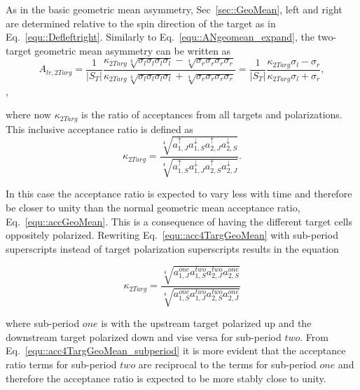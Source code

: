 As in the basic geometric mean asymmetry, Sec~\ref{sec::GeoMean}, left and right
are determined relative to the spin direction of the target as in
Eq.~\ref{equ::Defleftright}.  Similarly to Eq.~\ref{equ::ANgeomean_expand}, the
two-target geometric mean asymmetry can be written as
\begin{equation}
  A_{lr,2Targ}= \frac{1}{|S_T|}
  \frac{
    \kappa_{2Targ} \sqrt[4]{\sigma_l\sigma_l\sigma_l\sigma_l} -
    \sqrt[4]{\sigma_r\sigma_r\sigma_r\sigma_r}
  }{
    \kappa_{2Targ} \sqrt[4]{\sigma_l\sigma_l\sigma_l\sigma_l} +
    \sqrt[4]{\sigma_r\sigma_r\sigma_r\sigma_r}
  }
  =
  \frac{1}{|S_T|}
  \frac{\kappa_{2Targ}\sigma_l - \sigma_r}{
    \kappa_{2Targ}\sigma_l + \sigma_r},
  \label{equ::AN2targAcceptCancel}
\end{equation},

\noindent
where now $\kappa_{2Targ}$ is the ratio of acceptances from all targets and
polarizations.  This inclusive acceptance ratio is defined as
\begin{equation}
  \label{equ::acc4TargGeoMean}
  \kappa_{2Targ} =
  \frac{
    \sqrt[4]{
      a^\uparrow_{1,J}
      a^\downarrow_{1,S}
      a^\uparrow_{2,J}
      a^\downarrow_{2,S}}
  }{
    \sqrt[4]{
      a^\uparrow_{1,S}
      a^\downarrow_{1,J}
      a^\uparrow_{2,S}
      a^\downarrow_{2,J}}
  }.
\end{equation}

\noindent
In this case the acceptance ratio is expected to vary less with time and
therefore be closer to unity than the normal geometric mean acceptance ratio,
Eq.~\ref{equ::accGeoMean}.  This is a consequence of having the different target
cells oppositely polarized.  Rewriting Eq.~\ref{equ::acc4TargGeoMean} with
sub-period superscripts instead of target polarization superscripts results in
the equation

\begin{equation}
  \label{equ::acc4TargGeoMean_subperiod}
  \kappa_{2Targ} =
  \frac{ \sqrt[4]{ a^{one}_{1,J} a^{two}_{1,S} a^{two}_{2,J} a^{one}_{2,S} }
  }{
    \sqrt[4]{ a^{one}_{1,S} a^{two}_{1,J} a^{two}_{2,S} a^{one}_{2,J} }
  }
\end{equation}

\noindent
where sub-period $one$ is with the upstream target polarized up and the
downstream target polarized down and vise versa for sub-period $two$.  From
Eq.~\ref{equ::acc4TargGeoMean_subperiod} it is more evident that the acceptance
ratio terms for sub-period $two$ are reciprocal to the terms for sub-period
$one$ and therefore the acceptance ratio is expected to be more stably close to
unity.

